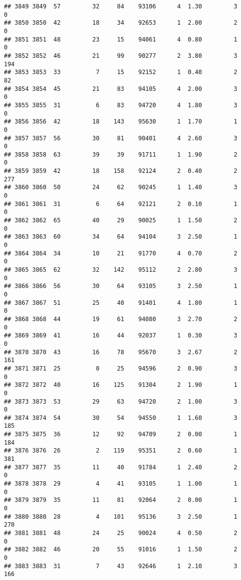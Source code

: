\documentclass[
]{article}
\begin{document}
\begin{verbatim}
## 3849 3849  57         32     84    93106      4  1.30         3        0
## 3850 3850  42         18     34    92653      1  2.00         2        0
## 3851 3851  48         23     15    94061      4  0.80         1        0
## 3852 3852  46         21     99    90277      2  3.80         3      194
## 3853 3853  33          7     15    92152      1  0.40         2       82
## 3854 3854  45         21     83    94105      4  2.00         3        0
## 3855 3855  31          6     83    94720      4  1.80         3        0
## 3856 3856  42         18    143    95630      1  1.70         1        0
## 3857 3857  56         30     81    90401      4  2.60         3        0
## 3858 3858  63         39     39    91711      1  1.90         2        0
## 3859 3859  42         18    158    92124      2  0.40         2      277
## 3860 3860  50         24     62    90245      1  1.40         3        0
## 3861 3861  31          6     64    92121      2  0.10         1        0
## 3862 3862  65         40     29    90025      1  1.50         2        0
## 3863 3863  60         34     64    94104      3  2.50         1        0
## 3864 3864  34         10     21    91770      4  0.70         2        0
## 3865 3865  62         32    142    95112      2  2.80         3        0
## 3866 3866  56         30     64    93105      3  2.50         1        0
## 3867 3867  51         25     40    91401      4  1.80         1        0
## 3868 3868  44         19     61    94080      3  2.70         2        0
## 3869 3869  41         16     44    92037      1  0.30         3        0
## 3870 3870  43         16     78    95670      3  2.67         2      161
## 3871 3871  25          0     25    94596      2  0.90         3        0
## 3872 3872  40         16    125    91304      2  1.90         1        0
## 3873 3873  53         29     63    94720      2  1.00         3        0
## 3874 3874  54         30     54    94550      1  1.60         3      185
## 3875 3875  36         12     92    94709      2  0.00         1      184
## 3876 3876  26          2    119    95351      2  0.60         1      381
## 3877 3877  35         11     40    91784      1  2.40         2        0
## 3878 3878  29          4     41    93105      1  1.00         1        0
## 3879 3879  35         11     81    92064      2  0.00         1        0
## 3880 3880  28          4    101    95136      3  2.50         1      270
## 3881 3881  48         24     25    90024      4  0.50         2        0
## 3882 3882  46         20     55    91016      1  1.50         2        0
## 3883 3883  31          7     43    92646      1  2.10         3      166

\end{verbatim}
\end{document}
